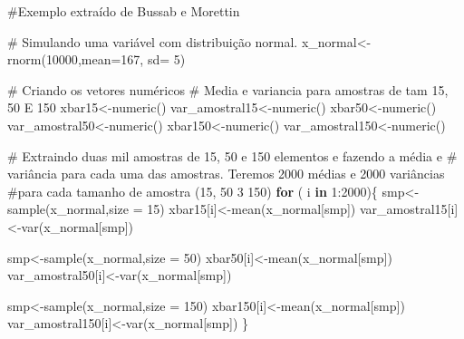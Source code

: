 \documentclass[
  letterpaper,
  DIV=11,
  numbers=noendperiod]{scrartcl}
\newenvironment{Shaded}{\begin{snugshade}}{\end{snugshade}}
\newcommand{\AttributeTok}[1]{\textcolor[rgb]{0.40,0.45,0.13}{#1}}
\newcommand{\CommentTok}[1]{\textcolor[rgb]{0.37,0.37,0.37}{#1}}
\newcommand{\ControlFlowTok}[1]{\textcolor[rgb]{0.00,0.23,0.31}{\textbf{#1}}}
\newcommand{\DecValTok}[1]{\textcolor[rgb]{0.68,0.00,0.00}{#1}}
\newcommand{\FunctionTok}[1]{\textcolor[rgb]{0.28,0.35,0.67}{#1}}
\newcommand{\NormalTok}[1]{\textcolor[rgb]{0.00,0.23,0.31}{#1}}
\newcommand{\OtherTok}[1]{\textcolor[rgb]{0.00,0.23,0.31}{#1}}
\newcommand{\SpecialCharTok}[1]{\textcolor[rgb]{0.37,0.37,0.37}{#1}}
\begin{document}
\begin{Shaded}
\begin{Highlighting}[]
\CommentTok{\#Exemplo extraído de Bussab e Morettin}

\CommentTok{\# Simulando uma variável com distribuição normal. }
\NormalTok{x\_normal}\OtherTok{\textless{}{-}}\FunctionTok{rnorm}\NormalTok{(}\DecValTok{10000}\NormalTok{,}\AttributeTok{mean=}\DecValTok{167}\NormalTok{, }\AttributeTok{sd=} \DecValTok{5}\NormalTok{)}

\CommentTok{\# Criando os vetores numéricos }
\CommentTok{\# Media e variancia para amostras de tam 15, 50 E 150}
\NormalTok{xbar15}\OtherTok{\textless{}{-}}\FunctionTok{numeric}\NormalTok{()}
\NormalTok{var\_amostral15}\OtherTok{\textless{}{-}}\FunctionTok{numeric}\NormalTok{()}
\NormalTok{xbar50}\OtherTok{\textless{}{-}}\FunctionTok{numeric}\NormalTok{()}
\NormalTok{var\_amostral50}\OtherTok{\textless{}{-}}\FunctionTok{numeric}\NormalTok{()}
\NormalTok{xbar150}\OtherTok{\textless{}{-}}\FunctionTok{numeric}\NormalTok{()}
\NormalTok{var\_amostral150}\OtherTok{\textless{}{-}}\FunctionTok{numeric}\NormalTok{()}

\CommentTok{\# Extraindo duas mil amostras de 15, 50 e 150 elementos e fazendo a média e }
  \CommentTok{\# variância para cada uma das amostras. Teremos 2000 médias e 2000 variâncias }
  \CommentTok{\#para cada tamanho de amostra (15, 50 3 150)}
\ControlFlowTok{for}\NormalTok{ ( i }\ControlFlowTok{in} \DecValTok{1}\SpecialCharTok{:}\DecValTok{2000}\NormalTok{)\{}
\NormalTok{  smp}\OtherTok{\textless{}{-}}\FunctionTok{sample}\NormalTok{(x\_normal,}\AttributeTok{size =} \DecValTok{15}\NormalTok{)}
\NormalTok{  xbar15[i]}\OtherTok{\textless{}{-}}\FunctionTok{mean}\NormalTok{(x\_normal[smp])}
\NormalTok{  var\_amostral15[i]}\OtherTok{\textless{}{-}}\FunctionTok{var}\NormalTok{(x\_normal[smp])}
  
\NormalTok{  smp}\OtherTok{\textless{}{-}}\FunctionTok{sample}\NormalTok{(x\_normal,}\AttributeTok{size =} \DecValTok{50}\NormalTok{)}
\NormalTok{  xbar50[i]}\OtherTok{\textless{}{-}}\FunctionTok{mean}\NormalTok{(x\_normal[smp])}
\NormalTok{  var\_amostral50[i]}\OtherTok{\textless{}{-}}\FunctionTok{var}\NormalTok{(x\_normal[smp])}
  
\NormalTok{  smp}\OtherTok{\textless{}{-}}\FunctionTok{sample}\NormalTok{(x\_normal,}\AttributeTok{size =} \DecValTok{150}\NormalTok{)}
\NormalTok{  xbar150[i]}\OtherTok{\textless{}{-}}\FunctionTok{mean}\NormalTok{(x\_normal[smp])}
\NormalTok{  var\_amostral150[i]}\OtherTok{\textless{}{-}}\FunctionTok{var}\NormalTok{(x\_normal[smp])}
\NormalTok{\}}


\end{Highlighting}
\end{Shaded}
\end{document}
